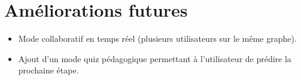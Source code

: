 \documentclass[a4paper,12pt]{report}
\begin{document}
\section*{Améliorations futures}

\begin{itemize}
    \item Mode collaboratif en temps réel (plusieurs utilisateurs sur le même graphe).
    \item Ajout d'un mode quiz pédagogique permettant à l'utilisateur de prédire la prochaine étape.
\end{itemize}
\end{document}
